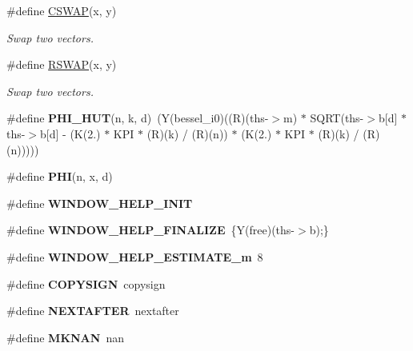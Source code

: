 \begin{DoxyCompactItemize}
\item 
\#define \hyperlink{group__nfftutil_ga18cf66b4ff69fd69cf3b8291c629e80b}{C\-S\-W\-A\-P}(x, y)
\begin{DoxyCompactList}\small\item\em Swap two vectors. \end{DoxyCompactList}\item 
\#define \hyperlink{group__nfftutil_ga134a708e91eb0967369f42de15be4c85}{R\-S\-W\-A\-P}(x, y)
\begin{DoxyCompactList}\small\item\em Swap two vectors. \end{DoxyCompactList}\item 
\hypertarget{group__nfftutil_gaa413603e4d4fc20705261f3a9dc82566}{\#define {\bfseries P\-H\-I\-\_\-\-H\-U\-T}(n, k, d)~(Y(bessel\-\_\-i0)((R)(ths-\/$>$m) $\ast$ S\-Q\-R\-T(ths-\/$>$b\mbox{[}d\mbox{]} $\ast$ ths-\/$>$b\mbox{[}d\mbox{]} -\/ (K(2.) $\ast$ K\-P\-I $\ast$ (R)(k) / (R)(n)) $\ast$ (K(2.) $\ast$ K\-P\-I $\ast$ (R)(k) / (R)(n)))))}\label{group__nfftutil_gaa413603e4d4fc20705261f3a9dc82566}

\item 
\#define {\bfseries P\-H\-I}(n, x, d)
\item 
\#define {\bfseries W\-I\-N\-D\-O\-W\-\_\-\-H\-E\-L\-P\-\_\-\-I\-N\-I\-T}
\item 
\hypertarget{group__nfftutil_gaafd97336d6085d380d018bc1c2f7789e}{\#define {\bfseries W\-I\-N\-D\-O\-W\-\_\-\-H\-E\-L\-P\-\_\-\-F\-I\-N\-A\-L\-I\-Z\-E}~\{Y(free)(ths-\/$>$b);\}}\label{group__nfftutil_gaafd97336d6085d380d018bc1c2f7789e}

\item 
\hypertarget{group__nfftutil_ga6228c60b2fff40a2d5f698e249e54731}{\#define {\bfseries W\-I\-N\-D\-O\-W\-\_\-\-H\-E\-L\-P\-\_\-\-E\-S\-T\-I\-M\-A\-T\-E\-\_\-m}~8}\label{group__nfftutil_ga6228c60b2fff40a2d5f698e249e54731}

\item 
\hypertarget{group__nfftutil_ga0b7f77e2473eb96891b0508e286c6d4e}{\#define {\bfseries C\-O\-P\-Y\-S\-I\-G\-N}~copysign}\label{group__nfftutil_ga0b7f77e2473eb96891b0508e286c6d4e}

\item 
\hypertarget{group__nfftutil_gaa93ade751d2059beef709becf178ece0}{\#define {\bfseries N\-E\-X\-T\-A\-F\-T\-E\-R}~nextafter}\label{group__nfftutil_gaa93ade751d2059beef709becf178ece0}

\item 
\hypertarget{group__nfftutil_gacfcf3fb0da11b997c26fd81a56bd8c4b}{\#define {\bfseries M\-K\-N\-A\-N}~nan}\label{group__nfftutil_gacfcf3fb0da11b997c26fd81a56bd8c4b}


\end{DoxyCompactItemize}
